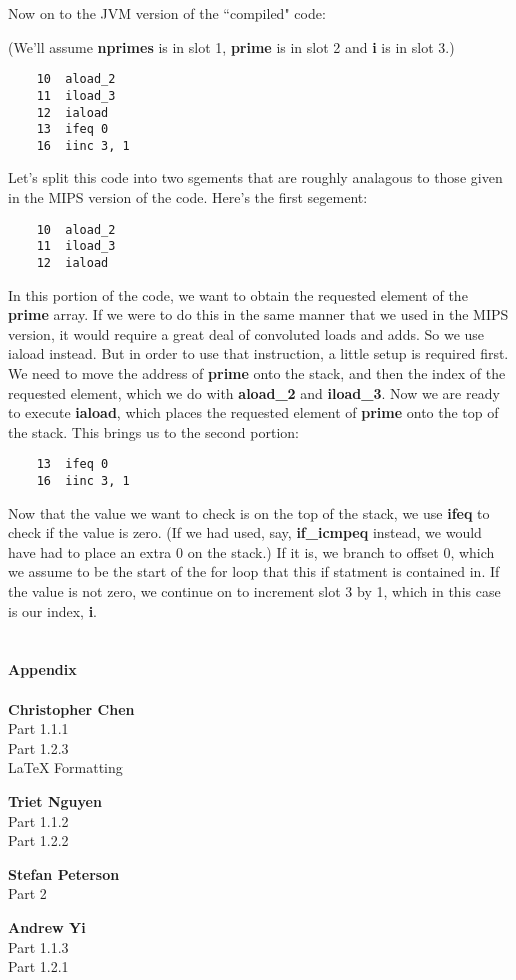 \documentclass[11pt]{article}
\begin{document}

Now on to the JVM version of the ``compiled" code:

(We'll assume \textbf{nprimes} is in slot 1, \textbf{prime} is in slot 2 and \textbf{i} is in slot 3.)

\begin{verbatim}
    10  aload_2
    11  iload_3
    12  iaload
    13  ifeq 0
    16  iinc 3, 1
\end{verbatim}

Let's split this code into two sgements that are roughly analagous to those given in the MIPS version of the code. Here's the first segement:

\begin{verbatim}
    10  aload_2
    11  iload_3
    12  iaload
\end{verbatim}

In this portion of the code, we want to obtain the requested element of the \textbf{prime} array. If we were to do this in the same manner that we used in the MIPS version, it would require a great deal of convoluted loads and adds. So we use iaload instead. But in order to use that instruction, a little setup is required first. We need to move the address of \textbf{prime} onto the stack, and then the index of the requested element, which we do with \textbf{aload\_2} and \textbf{iload\_3}. Now we are ready to execute \textbf{iaload}, which places the requested element of \textbf{prime} onto the top of the stack. This brings us to the second portion:

\begin{verbatim}
    13  ifeq 0
    16  iinc 3, 1
\end{verbatim}

Now that the value we want to check is on the top of the stack, we use \textbf{ifeq} to check if the value is zero. (If we had used, say, \textbf{if\_icmpeq} instead, we would have had to place an extra 0 on the stack.) If it is, we branch to offset 0, which we assume to be the start of the for loop that this if statment is contained in. If the value is not zero, we continue on to increment slot 3 by 1, which in this case is our index, \textbf{i}.

\part{}


\appendix
\textbf{\Large Appendix}
\\\\
\textbf{Christopher Chen}
\\Part 1.1.1
\\Part 1.2.3
\\LaTeX Formatting

\textbf{Triet Nguyen}
\\Part 1.1.2
\\Part 1.2.2

\textbf{Stefan Peterson}
\\Part 2

\textbf{Andrew Yi}
\\Part 1.1.3
\\Part 1.2.1
\end{document}

